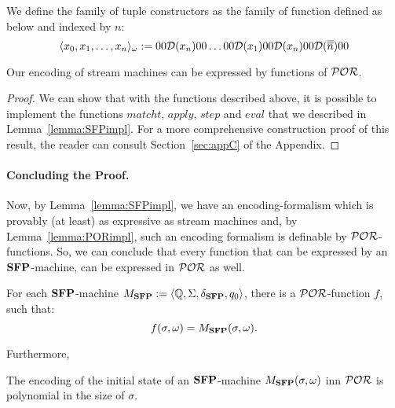 \begin{defn}
We define the family of tuple constructors as the family of function defined as below and indexed by $n$:
\[
\langle x_0, x_1, \ldots, x_n\rangle_\omega := 00 \mathcal D (x_n) 00 \ldots 00 \mathcal D (x_1) 00 \mathcal D(x_n) 00 \mathcal D(\overline{\overline{n}}) 00
\]
\end{defn}


\begin{lemma}\label{lemma:PORimpl}
Our encoding of stream machines
can be expressed by functions of $\mathcal{POR}$.
\end{lemma}

\begin{proof}
We can show that with the functions described above, it is possible to implement
the functions $matcht$, $apply$, $step$ and $eval$ that we described in Lemma~\ref{lemma:SFPimpl}. For a more comprehensive construction proof of this result,
the reader can consult Section~\ref{sec:appC} of the Appendix.
\end{proof}




\paragraph{Concluding the Proof.}
Now, by Lemma~\ref{lemma:SFPimpl},
we have an encoding-formalism
which is provably (at least) as expressive
as stream machines
and, by Lemma~\ref{lemma:PORimpl},
such an encoding formalism
is definable by $\mathcal{POR}$-functions.
So, we can conclude that every function
that can be expressed by an
$\mathbf{SFP}$-machine, can be expressed in $\mathcal{POR}$
as well.


\begin{prop}\label{Proposition1}
For each $\mathbf{SFP}$-machine $M_{\mathbf{SFP}}
:= \langle \mathbb{Q},\Sigma,\delta_{\mathbf{SFP}},q_0\rangle$,
there is a $\mathcal{POR}$-function $f$,
such that:
$$
f(\sigma,\omega) = M_{\mathbf{SFP}}(\sigma,\omega).
$$
\end{prop}
%
%
\noindent
Furthermore,


\begin{lemma}
The encoding of the initial state
of an $\mathbf{SFP}$-machine
$M_{\mathbf{SFP}}(\sigma,\omega)$
inn $\mathcal{POR}$
is polynomial in the size of $\sigma$.
\end{lemma}


